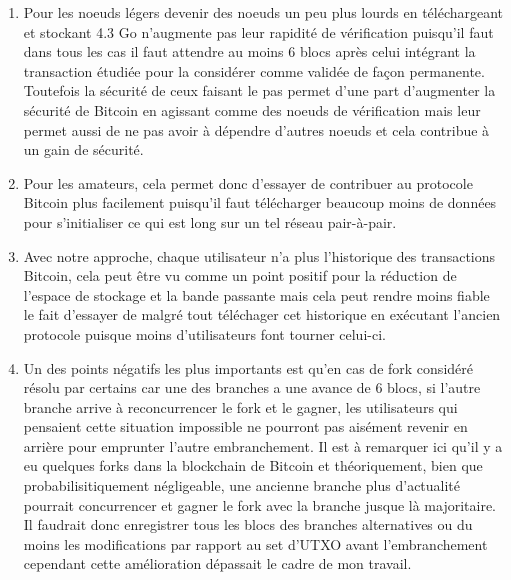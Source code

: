 \documentclass[12pt,a4paper]{article}
\begin{document}
	\begin{enumerate}
		\item Pour les noeuds légers devenir des noeuds un peu plus lourds en téléchargeant et stockant 4.3 Go n'augmente pas leur rapidité de vérification puisqu'il faut dans tous les cas il faut attendre au moins 6 blocs après celui intégrant la transaction étudiée pour la considérer comme validée de façon permanente. Toutefois la sécurité de ceux faisant le pas permet d'une part d'augmenter la sécurité de Bitcoin en agissant comme des noeuds de vérification mais leur permet aussi de ne pas avoir à dépendre d'autres noeuds et cela contribue à un gain de sécurité.
		\item Pour les amateurs, cela permet donc d'essayer de contribuer au protocole Bitcoin plus facilement puisqu'il faut télécharger beaucoup moins de données pour s'initialiser ce qui est long sur un tel réseau pair-à-pair.
		\item Avec notre approche, chaque utilisateur n'a plus l'historique des transactions Bitcoin, cela peut être vu comme un point positif pour la réduction de l'espace de stockage et la bande passante mais cela peut rendre moins fiable le fait d'essayer de malgré tout téléchager cet historique en exécutant l'ancien protocole puisque moins d'utilisateurs font tourner celui-ci.
		\item Un des points négatifs les plus importants est qu'en cas de fork considéré résolu par certains car une des branches a une avance de 6 blocs, si l'autre branche arrive à reconcurrencer le fork et le gagner, les utilisateurs qui pensaient cette situation impossible ne pourront pas aisément revenir en arrière pour emprunter l'autre embranchement. Il est à remarquer ici qu'il y a eu quelques forks dans la blockchain de Bitcoin et théoriquement, bien que probabilisitiquement négligeable, une ancienne branche plus d'actualité pourrait concurrencer et gagner le fork avec la branche jusque là majoritaire. Il faudrait donc enregistrer tous les blocs des branches alternatives ou du moins les modifications par rapport au set d'UTXO avant l'embranchement cependant cette amélioration dépassait le cadre de mon travail. %
	\end{enumerate}
	
	
\end{document}
